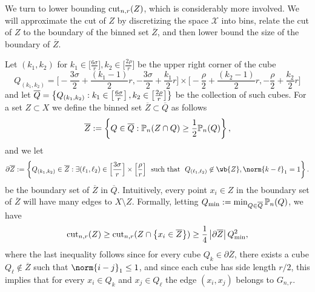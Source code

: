	We turn to lower bounding $\mathrm{cut}_{n,r}(Z)$, which is considerably more involved. We will approximate the cut of $Z$ by discretizing the space $\mathcal{X}$ into bins, relate the cut of $Z$ to the boundary of the binned set $\overline{Z}$, and then lower bound the size of the boundary of $\overline{Z}$.
	
	Let $(k_1,k_2)$ for $k_1 \in \bigl[\frac{6\sigma}{r}\bigr], k_2 \in \bigl[\frac{2\rho}{r}\bigr]$ be the upper right  corner of the cube
	\begin{equation*}
	Q_{(k_1,k_2)} = \biggl[-\frac{3\sigma}{2} + \frac{(k_1 - 1)}{2}r, -\frac{3\sigma}{2} + \frac{k_1}{2}r\biggr] \times \biggl[-\frac{\rho}{2} + \frac{(k_2 - 1)}{2}r, -\frac{\rho}{2} + \frac{k_2}{2}r\biggr]
	\end{equation*}
	and let $\overline{Q} = \left\{Q_{(k_1,k_2)}: k_1 \in \left[\frac{6\sigma}{r}\right], k_2 \in \bigl[\frac{2\rho}{r}\bigr]\right\}$ be the collection of such cubes. For a set $Z \subset X$ we define the binned set $\overline{Z} \subset \overline{Q}$ as follows
	\begin{equation*}
	\overline{Z} := \left\{Q \in \overline{Q}: \mathbb{P}_n(Z \cap Q) \geq \frac{1}{2}\mathbb{P}_n(Q)\right\},
	\end{equation*}
	and we let 
	\begin{equation*}
	\partial \overline{Z} := \set{Q_{(k_1,k_2)} \in \overline{Z}: \exists (\ell_1,\ell_2) \in \Bigl[\frac{3\sigma}{r}\Bigr] \times \Bigl[\frac{\rho}{r}\Bigr]~~\textrm{such that}~~Q_{(\ell_1,\ell_2)} \not\in \wb{Z}, \norm{k - \ell}_1 = 1}.
	\end{equation*}
	be the boundary set of $\overline{Z}$ in $\overline{Q}$. Intuitively, every point $x_i \in Z$ in the boundary set of $\overline{Z}$ will have many edges to $X\setminus Z$. Formally, letting $Q_{\min} := \min_{Q \in \overline{Q}} \mathbb{P}_n(Q)$, we have
	\begin{equation}
	\label{eqn:normalized_cut_lb_pf1}
	\mathrm{cut}_{n,r}(Z) \geq \mathrm{cut}_{n,r}(Z \cap \left\{x_i \in \overline{Z}\right\}) \geq \frac{1}{4} \left \lvert \partial \overline{Z} \right \rvert Q_{\min}^2,
	\end{equation}
	where the last inequality follows since for every cube $Q_k \in \partial\overline{Z}$, there exists a cube $Q_\ell \not\in \overline{Z}$ such that $\norm{i - j}_1 \leq 1$, and since each cube has side length $r/2$, this implies that for every $x_i \in Q_k$ and $x_j \in Q_\ell$ the edge $(x_i,x_j)$ belongs to $G_{n,r}$. 
	
